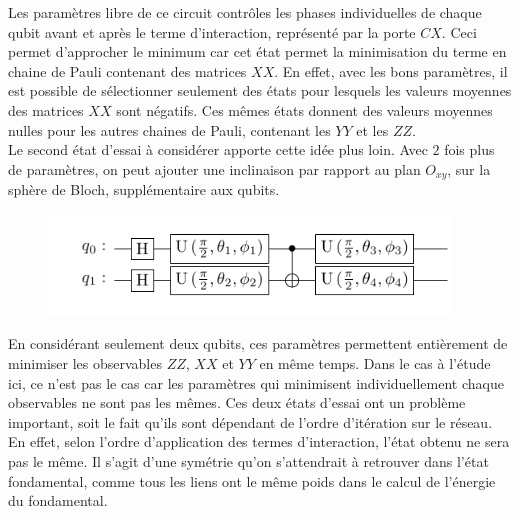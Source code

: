 \documentclass[../main.tex]{subfiles}
\begin{document}
        Les paramètres libre de ce circuit contrôles les phases individuelles
        de chaque qubit avant et après le terme d'interaction, représenté par
        la porte $CX$. Ceci permet d'approcher le minimum car cet état permet
        la minimisation du terme en chaine de Pauli contenant des matrices $XX$.
        En effet, avec les bons paramètres, il est possible de sélectionner
        seulement des états pour lesquels les valeurs moyennes des matrices $XX$
        sont négatifs. Ces mêmes états donnent des valeurs moyennes nulles pour
        les autres chaines de Pauli, contenant les $YY$ et les $ZZ$.\\
        Le second état d'essai à considérer apporte cette idée plus loin. Avec
        $2$ fois plus de paramètres, on peut ajouter une inclinaison par rapport
        au plan $O_{xy}$, sur la sphère de Bloch, supplémentaire aux qubits.
        \begin{figure}[H]
            \begin{center}
                \includegraphics[width=0.95\textwidth]{figs/ansatz2.pdf}
            \end{center}
            \label{fig:}
        \end{figure}
        En considérant seulement deux qubits, ces paramètres permettent entièrement
        de minimiser les observables $ZZ$, $XX$ et $YY$ en même temps. Dans le cas
        à l'étude ici, ce n'est pas le cas car les paramètres qui minimisent
        individuellement chaque observables ne sont pas les mêmes. Ces deux états
        d'essai ont un problème important, soit le fait qu'ils sont dépendant
        de l'ordre d'itération sur le réseau. En effet, selon l'ordre d'application
        des termes d'interaction, l'état obtenu ne sera pas le même. Il s'agit
        d'une symétrie qu'on s'attendrait à retrouver dans l'état fondamental, comme
        tous les liens ont le même poids dans le calcul de l'énergie du fondamental.





\clearpage
\end{document}
